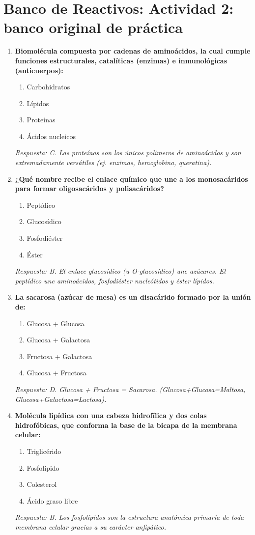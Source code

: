\section{Banco de Reactivos: Actividad 2: banco original de práctica}
\begin{enumerate}[label=\textbf{\arabic*.}]
    \item \textbf{Biomolécula compuesta por cadenas de aminoácidos, la cual cumple funciones estructurales, catalíticas (enzimas) e inmunológicas (anticuerpos):}
    \begin{enumerate}
        \item[A)] Carbohidratos
        \item[B)] Lípidos
        \item[C)] Proteínas
        \item[D)] Ácidos nucleicos
    \end{enumerate}
    \textit{Respuesta: C. Las proteínas son los únicos polímeros de aminoácidos y son extremadamente versátiles (ej. enzimas, hemoglobina, queratina).}

    \item \textbf{¿Qué nombre recibe el enlace químico que une a los monosacáridos para formar oligosacáridos y polisacáridos?}
    \begin{enumerate}
        \item[A)] Peptídico
        \item[B)] Glucosídico
        \item[C)] Fosfodiéster
        \item[D)] Éster
    \end{enumerate}
    \textit{Respuesta: B. El enlace glucosídico (u O-glucosídico) une azúcares. El peptídico une aminoácidos, fosfodiéster nucleótidos y éster lípidos.}

    \item \textbf{La sacarosa (azúcar de mesa) es un disacárido formado por la unión de:}
    \begin{enumerate}
        \item[A)] Glucosa + Glucosa
        \item[B)] Glucosa + Galactosa
        \item[C)] Fructosa + Galactosa
        \item[D)] Glucosa + Fructosa
    \end{enumerate}
    \textit{Respuesta: D. Glucosa + Fructosa = Sacarosa. (Glucosa+Glucosa=Maltosa, Glucosa+Galactosa=Lactosa).}

    \item \textbf{Molécula lipídica con una cabeza hidrofílica y dos colas hidrofóbicas, que conforma la base de la bicapa de la membrana celular:}
    \begin{enumerate}
        \item[A)] Triglicérido
        \item[B)] Fosfolípido
        \item[C)] Colesterol
        \item[D)] Ácido graso libre
    \end{enumerate}
    \textit{Respuesta: B. Los fosfolípidos son la estructura anatómica primaria de toda membrana celular gracias a su carácter anfipático.}


\end{enumerate}
